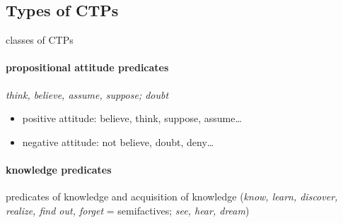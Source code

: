 \documentclass[a4,12pt]{scrartcl}
\begin{document}
\subsection{Types of CTPs}%
classes of CTPs \cite{noonan2007}
\paragraph {\bf propositional attitude predicates} {\it think, believe, assume, suppose; doubt}
\begin{itemize}
\item positive attitude: believe, think, suppose, assume\dots
\item negative attitude: not believe, doubt, deny\dots
\end{itemize}

\begin{exe}
\ex %

\ex %

\ex %

\ex %

\ex %

\ex %


\ex %


\end{exe}


\paragraph {\bf knowledge predicates} predicates of knowledge and acquisition of knowledge ({\it know, learn, discover, realize, find out, forget} = semifactives; {\it see, hear, dream})  \cite[3.2.5]{noonan2007}
\end{document}

